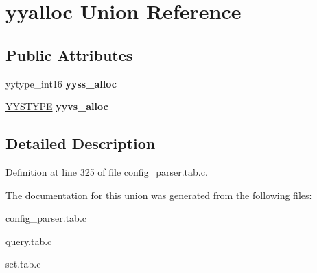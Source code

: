 \hypertarget{unionyyalloc}{
\section{yyalloc Union Reference}
\label{unionyyalloc}
}
\subsection*{Public Attributes}
\begin{DoxyCompactItemize}
\item 
\hypertarget{unionyyalloc_a4800e0520a89a4789afa7b5d82197e65}{
yytype\_\-int16 {\bfseries yyss\_\-alloc}}
\label{unionyyalloc_a4800e0520a89a4789afa7b5d82197e65}

\item 
\hypertarget{unionyyalloc_a9326f4fdc6f737a929444427836d8928}{
\hyperlink{unionYYSTYPE}{YYSTYPE} {\bfseries yyvs\_\-alloc}}
\label{unionyyalloc_a9326f4fdc6f737a929444427836d8928}

\end{DoxyCompactItemize}


\subsection{Detailed Description}


Definition at line 325 of file config\_\-parser.tab.c.



The documentation for this union was generated from the following files:\begin{DoxyCompactItemize}
\item 
config\_\-parser.tab.c\item 
query.tab.c\item 
set.tab.c\end{DoxyCompactItemize}
